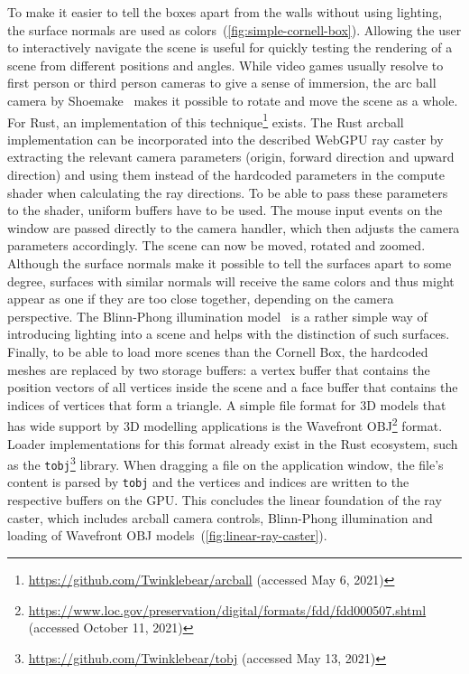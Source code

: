 To make it easier to tell the boxes apart from the walls without using lighting, the surface normals are used as colors~(\cref{fig:simple-cornell-box}).
Allowing the user to interactively navigate the scene is useful for quickly testing the rendering of a scene from different positions and angles.
While video games usually resolve to first person or third person cameras to give a sense of immersion, the arc ball camera by Shoemake~\cite{shoemakeARCBALLUserInterface1992} makes it possible to rotate and move the scene as a whole.
For Rust, an implementation of this technique\footnote{\url{https://github.com/Twinklebear/arcball} (accessed May 6, 2021)} exists.
The Rust arcball implementation can be incorporated into the described WebGPU ray caster by extracting the relevant camera parameters (origin, forward direction and upward direction) and using them instead of the hardcoded parameters in the compute shader when calculating the ray directions.
To be able to pass these parameters to the shader, uniform buffers have to be used.
The mouse input events on the window are passed directly to the camera handler, which then adjusts the camera parameters accordingly.
The scene can now be moved, rotated and zoomed.
Although the surface normals make it possible to tell the surfaces apart to some degree, surfaces with similar normals will receive the same colors and thus might appear as one if they are too close together, depending on the camera perspective.
The Blinn-Phong illumination model~\cite{blinnModelsLightReflection1977} is a rather simple way of introducing lighting into a scene and helps with the distinction of such surfaces.
Finally, to be able to load more scenes than the Cornell Box, the hardcoded meshes are replaced by two storage buffers: a vertex buffer that contains the position vectors of all vertices inside the scene and a face buffer that contains the indices of vertices that form a triangle.
A simple file format for 3D models that has wide support by 3D modelling applications is the Wavefront OBJ\footnote{\url{https://www.loc.gov/preservation/digital/formats/fdd/fdd000507.shtml} (accessed October 11, 2021)}  format.
Loader implementations for this format already exist in the Rust ecosystem, such as the \texttt{tobj}\footnote{\url{https://github.com/Twinklebear/tobj} (accessed May 13, 2021)} library.
When dragging a file on the application window, the file's content is parsed by \texttt{tobj} and the vertices and indices are written to the respective buffers on the GPU.
This concludes the linear foundation of the ray caster, which includes arcball camera controls, Blinn-Phong illumination and loading of Wavefront OBJ models~(\cref{fig:linear-ray-caster}).

